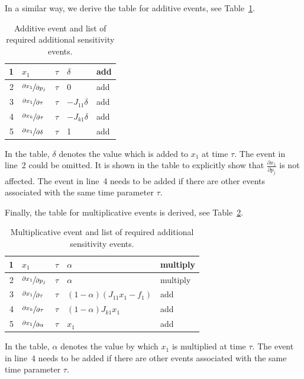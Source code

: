 \documentclass[journal, a4paper]{IEEEtran}
\begin{document}
In a similar way, we derive the table for additive events, see Table~\ref{tab:additive}.
\begin{table}[ht]
\caption{Additive event and list of required additional sensitivity events.}
\label{tab:additive}
\begin{center}
\begin{tabular}{|r|l|l|l|l|}\hline
     1 & $x_1$ & $\tau$ & $\delta$ & add \\
     \hline
     2 & $\sfrac{\partial x_1}{\partial p_j}$ & $\tau$ & $0$ & add \\
     3 & $\sfrac{\partial x_1}{\partial \tau}$ & $\tau$ & $-J_{11}\delta$ & add \\
     4 & $\sfrac{\partial x_k}{\partial \tau}$ & $\tau$ & $-J_{k1}\delta$ & add \\
     5 &$\sfrac{\partial x_1}{\partial \delta}$ & $\tau$ & 1 & add \\
     \hline
\end{tabular}
\end{center}
\end{table}
In the table, $\delta$ denotes the value which is added to $x_1$ at time $\tau$. The event in line~2 could be omitted. It is shown in the table to explicitly show that $\frac{\partial x_1}{\partial p_j}$ is not affected. The event in line~4 needs to be added if there are other events associated with the same time parameter $\tau$.

Finally, the table for multiplicative events is derived, see Table~\ref{tab:multi}.
\begin{table}[ht]
\caption{Multiplicative event and list of required additional sensitivity events.}
\label{tab:multi}
\begin{center}
\begin{tabular}{|r|l|l|l|l|}\hline
     1 & $x_1$ & $\tau$ & $\alpha$ & multiply \\
     \hline
     2 & $\sfrac{\partial x_1}{\partial p_j}$ & $\tau$ & $\alpha$ & multiply \\
     3 & $\sfrac{\partial x_1}{\partial \tau}$ & $\tau$ & $(1-\alpha)(J_{11}x_1-f_1)$ & add \\
     4 & $\sfrac{\partial x_k}{\partial \tau}$ & $\tau$ & $(1-\alpha)J_{k1}x_1$ & add \\
     5 &$\sfrac{\partial x_1}{\partial \alpha}$ & $\tau$ & $x_1$ & add \\
     \hline
\end{tabular}
\end{center}
\end{table}
In the table, $\alpha$ denotes the value by which $x_1$ is multiplied at time $\tau$. The event in line~4 needs to be added if there are other events associated with the same time parameter $\tau$.
\end{document}
